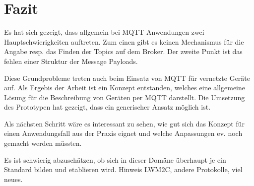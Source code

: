 \chapter{Fazit}
\label{chap:schlussfolgerungen}

Es hat sich gezeigt, dass allgemein bei MQTT Anwendungen zwei Hauptschwierigkeiten auftreten. Zum einen gibt es keinen Mechanismus für die Angabe resp. das Finden der Topics auf dem Broker. Der zweite Punkt ist das fehlen einer Struktur der Message Payloads. 

Diese Grundprobleme treten auch beim Einsatz von MQTT für vernetzte Geräte auf. Als Ergebis der Arbeit ist ein Konzept entstanden, welches eine allgemeine Lösung für die Beschreibung von Geräten per MQTT darstellt. Die Umsetzung des Prototypen hat gezeigt, dass ein generischer Ansatz möglich ist.

Als nächsten Schritt wäre es interessant zu sehen, wie gut sich das Konzept für einen Anwendungsfall aus der Praxis eignet und welche Anpassungen ev. noch gemacht werden müssten.

Es ist schwierig abzuschätzen, ob sich in dieser Domäne überhaupt je ein Standard bilden und etablieren wird.
Hinweis LWM2C, andere Protokolle, viel neues.